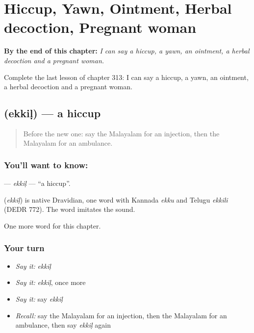 
\chapter{Hiccup, Yawn, Ointment, Herbal decoction, Pregnant woman}
\label{ch:ml-hiccup-yawn-ointment-herbal-decoction-pregnant-woman}

\begin{chapteropening}
\textbf{By the end of this chapter:} \emph{I can say a hiccup, a yawn, an ointment, a herbal decoction and a pregnant woman.}

Complete the last lesson of chapter 313: I can say a hiccup, a yawn, an ointment, a herbal decoction and a pregnant woman.
\end{chapteropening}

\section[\texorpdfstring{\ml{എക്കിൾ} (ekkiḷ)}{എക്കിൾ (ekkiḷ)}]{ (ekkiḷ) — a hiccup}

\label{lesson:ML-C313-ekkil}



\begin{quote}
Before the new one: say the Malayalam for an injection, then the Malayalam for an ambulance.
\end{quote}

\subsection*{You'll want to know: }
\textbf{} — \emph{ekkiḷ} — \textquotedblleft{}a hiccup\textquotedblright{}.

\begin{cousinweb}
\textbf{} (\emph{ekkiḷ}) is native Dravidian, one word with Kannada \emph{ekku} and Telugu \emph{ekkili} (DEDR 772). The word imitates the sound.
\end{cousinweb}

\begin{grammarlens}[title={What you've built}]
One more word for this chapter.
\end{grammarlens}

\subsection*{Your turn}
\begin{itemize}
\raggedright
  \item \emph{Say it:} \emph{ekkiḷ}
  \item \emph{Say it:} \emph{ekkiḷ}, once more
  \item \emph{Say it:} say \emph{ekkiḷ}
  \item \emph{Recall:} say the Malayalam for an injection, then the Malayalam for an ambulance, then say \emph{ekkiḷ} again
\end{itemize}

